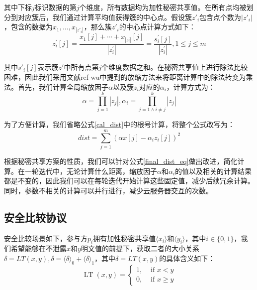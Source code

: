 其中下标$j$标识数据的第$j$个维度，所有数据均为加性秘密共享值。在所有点均被划分到对应簇后，我们通过计算平均值获得簇的中心点。假设簇$z'_i$包含点个数为$|z'_i|$，包含的数据为${x_1,...,x_{|z'_i|}}$，那么簇$z'_i$的中心点计算方式如下：
\begin{equation}
    \label{cal_center}
    z_{i}^{\prime}[j]=\frac{x_{1}[j]+\cdots+x_{\left|z_{i}^{\prime}\right|}[j]}{\left|z_{i}^{\prime}\right|}=\frac{s_{i}^{\prime}[j]}{\left|z_{i}^{\prime}\right|}, 1 \leq j \leq m
\end{equation}

其中$s'_i[j]$表示簇$z'$中所有点第$j$个维度数据之和。在秘密共享值上进行除法比较困难，因此我们采用文献ref-wu中提到的放缩方法来将距离计算中的除法转变为乘法。首先，我们计算全局缩放因子$\alpha$以及簇$z_i$对应的$\alpha_i$，计算方式为：
\begin{equation}
    \label{cal_scale}
    \alpha=\prod_{j=1}^{k}\left|z_{j}\right|, \alpha_{i}=\prod_{j=1 \wedge i \neq j}^{k}\left|z_{j}\right|
\end{equation}

为了方便计算，我们省略公式\ref{cal_dist}中的根号计算，将整个公式改写为：
\begin{equation}
    \label{final_dist_eq}
    dist = \sum_{j=1}^{m}(\alpha x[j] - \alpha_{i}z_i[j])^2
\end{equation}

根据秘密共享方案的性质，我们可以针对公式\ref{final_dist_eq}做出改进，简化计算。在一轮迭代中，无论计算什么距离，缩放因子$\alpha$和$\alpha_i$的值以及相关的计算结果都是不变的，因此我们可以在每轮迭代开始计算这些固定值，减少后续冗余计算。同时，参数不相关的计算可以并行进行，减少云服务器交互的次数。

\subsection{安全比较协议}
安全比较场景如下，参与方$p_i$拥有加性秘密共享值$\langle x_i \rangle$和$\langle y_i \rangle$，其中$i \in \{0, 1\}$，我们希望能够在不泄露$x$和$y$明文值的前提下，获取二者的大小关系$\delta = LT(x, y), \delta = \langle \delta \rangle_0 + \langle \delta \rangle_1$，其中$\delta = LT(x, y)$的具体含义如下：
\begin{equation}
    \operatorname{LT}(x, y)= \begin{cases}1, & \text { if } x<y \\ 0, & \text { if } x \geq y\end{cases}
\end{equation}

